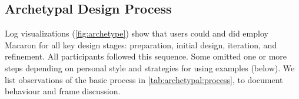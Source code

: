 \subsection{Archetypal Design Process}
Log visualizations (\autoref{fig:archetype}) show that users could and did employ Macaron for all key design stages: preparation, initial design, iteration, and refinement. %
All participants followed this sequence.
Some omitted one or more steps depending on personal style and strategies for using examples (below). %
We list observations of the basic process in \autoref{tab:archetypal:process}, to document behaviour and frame discussion.





    
